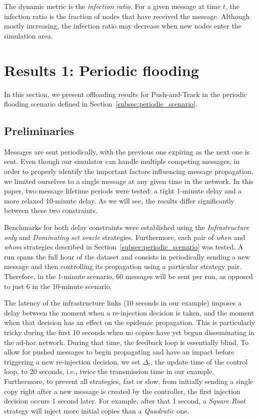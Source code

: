 \documentclass[preprint]{elsarticle}
\begin{document}
The dynamic metric is the \emph{infection ratio}. For a given message at time $t$, the infection ratio is the fraction of nodes that have received the message. Although mostly increasing, the infection ratio may decrease when new nodes enter the simulation area.


\section{Results 1: Periodic flooding}
\label{sec:periodic}

In this section, we present offloading results for Push-and-Track in the periodic flooding scenario defined in Section~\ref{subsec:periodic_scenario}.

\subsection{Preliminaries}
\label{subsec:periodic_preliminaries}

Messages are sent periodically, with the previous one expiring as the next one is sent. Even though our simulator can handle multiple competing messages, in order to properly identify the important factors influencing message propagation, we limited ourselves to a single message at any given time in the network. In this paper, two message lifetime periods were tested: a tight 1-minute delay and a more relaxed 10-minute delay. As we will see, the results differ significantly between these two constraints.

Benchmarks for both delay constraints were established using the \textit{Infrastructure only} and \textit{Dominating set oracle} strategies. Furthermore, each pair of \textit{when} and \textit{whom} strategies described in Section~\ref{subsec:periodic_scenario} was tested. A run spans the full hour of the dataset and consists in periodically sending a new message and then controlling its propagation using a particular strategy pair. Therefore, in the 1-minute scenario, 60 messages will be sent per run, as opposed to just 6 in the 10-minute scenario.

The latency of the infrastructure links (10 seconds in our example) imposes a delay between the moment when a re-injection decision is taken, and the moment when that decision has an effect on the epidemic propagation. This is particularly tricky during the first 10 seconds when no copies have yet begun disseminating in the ad-hoc network. During that time, the feedback loop is essentially blind. To allow for pushed messages to begin propagating and have an impact before triggering a new re-injection decision, we set $\Delta_t$, the update time of the control loop, to 20 seconds, i.e., twice the transmission time in our example. Furthermore, to prevent all strategies, fast or slow, from initially sending a single copy right after a new message is created by the controller, the first injection decision occurs 1 second later. For example, after that 1 second, a \textit{Square Root} strategy will inject more initial copies than a \textit{Quadratic} one.
\end{document}
